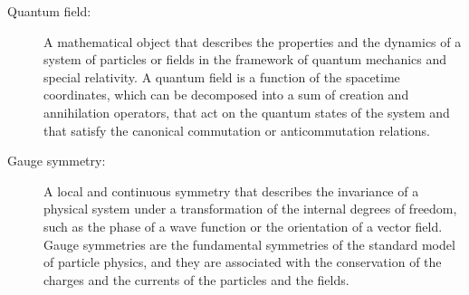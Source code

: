 \begin{tcolorbox}[colback=blue!5!white,colframe=blue!75!black,title=New terms]
\begin{description}
\item[Quantum field:] A mathematical object that describes the properties and the dynamics of a system of particles or fields in the framework of quantum mechanics and special relativity. A quantum field is a function of the spacetime coordinates, which can be decomposed into a sum of creation and annihilation operators, that act on the quantum states of the system and that satisfy the canonical commutation or anticommutation relations.
\item[Gauge symmetry:] A local and continuous symmetry that describes the invariance of a physical system under a transformation of the internal degrees of freedom, such as the phase of a wave function or the orientation of a vector field. Gauge symmetries are the fundamental symmetries of the standard model of particle physics, and they are associated with the conservation of the charges and the currents of the particles and the fields.
\end{description}
\end{tcolorbox}


